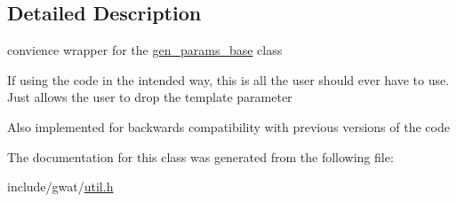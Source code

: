 \subsection{Detailed Description}
convience wrapper for the \hyperlink{classgen__params__base}{gen\+\_\+params\+\_\+base} class 

If using the code in the intended way, this is all the user should ever have to use. Just allows the user to drop the template parameter

Also implemented for backwards compatibility with previous versions of the code 

The documentation for this class was generated from the following file\+:\begin{DoxyCompactItemize}
\item 
include/gwat/\hyperlink{util_8h}{util.\+h}\end{DoxyCompactItemize}
